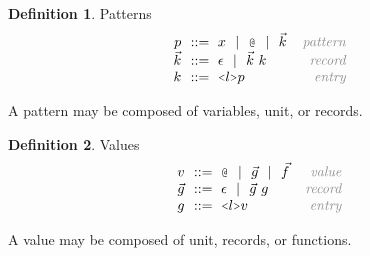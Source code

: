 \documentclass[acmsmall]{acmart}
\theoremstyle{definition}
\newtheorem{definition}{Definition}[section]
\begin{document}
\hfill
\begin{definition} Patterns 
  \label{def:patterns}
  \[\begin{array}[t]{r@{}l@{}r}
    \nonterm{p} & \is 
      x \sep
      \J{@} \sep
      \vec{k}
    & \com{pattern}
    \\
    \nonterm{\vec{k}} & \is \epsilon \sep \vec{k}\ k
    & \com{record}
    \\
    \nonterm{k} & \is \J{<}l\J{>}p
    & \com{entry}
  \end{array}\]
\end{definition}
\hfill

A pattern may be composed of variables, unit, or records. 

\hfill
\begin{definition} Values 
  \label{def:values}
  \[\begin{array}[t]{r@{}l@{}r}
    \nonterm{v} & \is 
      \J{@} \sep
      \vec{g} \sep
      \vec{f}
    & \com{value}
    \\
    \nonterm{\vec{g}} & \is \epsilon \sep \vec{g}\ g
    & \com{record}
    \\
    \nonterm{g} & \is \J{<}l\J{>}v
    & \com{entry}
  \end{array}\]
\end{definition}
\hfill

A value may be composed of unit, records, or functions. 
\end{document}
